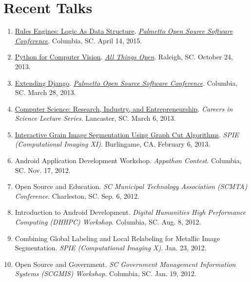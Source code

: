 \documentclass[10pt]{article}
\begin{document}
\section{Recent Talks}
{\footnotesize
\begin{enumerate}[align=left,labelsep=0em]
\renewcommand{\labelenumi}{[\arabic{enumi}]}
\item \href{http://www.malloc47.com/posscon2015/}{Rules Engines: Logic As Data Structure}. \emph{\href{http://posscon.org/}{Palmetto Open Source Software Conference}}. Columbia, SC. April 14, 2015.
\item \href{http://www.malloc47.com/ato2013/}{Python for Computer Vision}. \emph{\href{http://allthingsopen.org/}{All Things Open}}. Raleigh, SC. October 24, 2013.
\item \href{http://www.malloc47.com/posscon2013/}{Extending Django}. \emph{\href{http://posscon.org/}{Palmetto Open Source Software Conference}}.  Columbia, SC.  March 28, 2013.
\item \href{http://www.malloc47.com/cs-careers/}{Computer Science: Research, Industry, and Entrepreneurship}.  \emph{Careers in Science Lecture Series}.  Lancaster, SC.  March 6, 2013.
\item \href{http://www.malloc47.com/spie2013/}{Interactive Grain Image Segmentation Using Graph Cut Algorithms}.  \emph{SPIE (Computational Imaging XI)}.  Burlingame, CA.  February 6, 2013.
\item Android Application Development Workshop.  \emph{Appathon Contest}.  Columbia, SC.  Nov. 17, 2012.
\item Open Source and Education. \emph{SC Municipal Technology Association (SCMTA) Conference}. Charleston, SC.  Sep. 6, 2012.
\item Introduction to Android Development.  \emph{Digital Humanities High Performance Computing (DHHPC) Workshop}.  Columbia, SC.  Aug. 8, 2012.
\item Combining Global Labeling and Local Relabeling for Metallic Image Segmentation.  \emph{SPIE (Computational Imaging X)}. Jan. 23, 2012.
\item Open Source and Government.  \emph{SC Government Management Information Systems (SCGMIS) Workshop.}  Columbia, SC.  Jan. 19, 2012.
\end{enumerate} }
\end{document}
